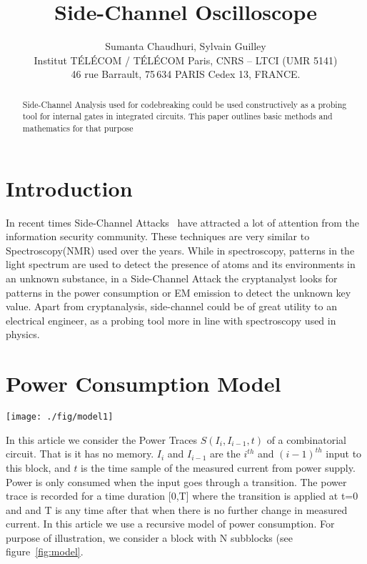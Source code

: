 \documentclass[a4]{IEEEtran}
\begin{document}
\title{Side-Channel Oscilloscope}
\author{Sumanta Chaudhuri, Sylvain Guilley \\
Institut T\'EL\'ECOM / T\'EL\'ECOM Paris, CNRS -- LTCI (UMR 5141)\\
46 rue Barrault, 75\,634 PARIS Cedex 13, FRANCE. \\
}


\maketitle
\begin{abstract}
Side-Channel Analysis used for codebreaking could be used constructively as a probing
tool for internal gates in integrated circuits. This paper outlines basic methods
and mathematics for that purpose
\end{abstract}

\section{Introduction}
\label{sec:intro}
In recent times Side-Channel Attacks~\cite{kocher-dpa_and_related_attacks} have attracted a lot of attention from the information 
security community. These techniques are very similar to Spectroscopy(NMR) used over the years.
While in spectroscopy, patterns in the light spectrum are used to detect the presence of atoms and its environments
in an unknown substance, in a Side-Channel Attack the cryptanalyst looks for patterns in the power consumption or EM 
emission to detect the unknown key value. Apart from cryptanalysis, side-channel could be of great utility to an electrical 
engineer, as a probing tool more in line with spectroscopy used in physics. 
\section{Power Consumption Model}
\begin{figure*}
\centering
\texttt{[image: ./fig/model1]}
\caption{Power Consumption Model.}
\label{fig:model}
\end{figure*}
In this article we consider the Power Traces $S(I_i,I_{i-1},t)$ of a combinatorial circuit. That is it has no memory. 
$I_i$ and $I_{i-1}$ are the $i^{th}$ and $(i-1)^{th}$ input to this block, and $t$ is the time sample of the measured 
current from power supply. Power is only consumed when the input goes through a transition. The power trace is recorded 
for a time duration [0,T] where the transition is applied at t=0 and and T is any time after that when there is no further 
change in  measured current. 
In this article we use a recursive model of power consumption. For purpose of illustration, we consider a block with N subblocks (see figure~\ref{fig:model}. 
\end{document}
